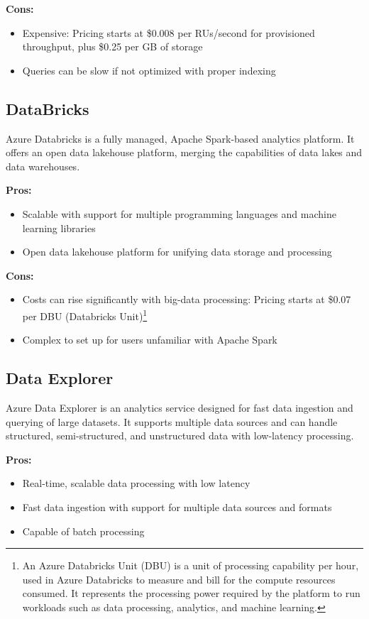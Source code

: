 \textbf{Cons:}
\begin{itemize}
    \item Expensive: Pricing starts at \$0.008 per RUs/second for provisioned throughput, plus \$0.25 per GB of storage
    \item Queries can be slow if not optimized with proper indexing
\end{itemize}

\subsection*{DataBricks}
\label{azure:databricks}
Azure Databricks is a fully managed, Apache Spark-based analytics platform. It offers an open data lakehouse platform, merging the capabilities of data lakes and data warehouses.

\textbf{Pros:}
\begin{itemize}
    \item Scalable with support for multiple programming languages and machine learning libraries
    \item Open data lakehouse platform for unifying data storage and processing
\end{itemize}

\textbf{Cons:}
\begin{itemize}
    \item Costs can rise significantly with big-data processing: Pricing starts at \$0.07 per DBU (Databricks Unit)\footnote{An Azure Databricks Unit (DBU) is a unit of processing capability per hour, used in Azure Databricks to measure and bill for the compute resources consumed. It represents the processing power required by the platform to run workloads such as data processing, analytics, and machine learning.}
    \item Complex to set up for users unfamiliar with Apache Spark
\end{itemize}

\subsection*{Data Explorer}
\label{azure:data-explorer}
Azure Data Explorer is an analytics service designed for fast data ingestion and querying of large datasets. It supports multiple data sources and can handle structured, semi-structured, and unstructured data with low-latency processing.

\textbf{Pros:}
\begin{itemize}
    \item Real-time, scalable data processing with low latency
    \item Fast data ingestion with support for multiple data sources and formats
    \item Capable of batch processing
\end{itemize}

